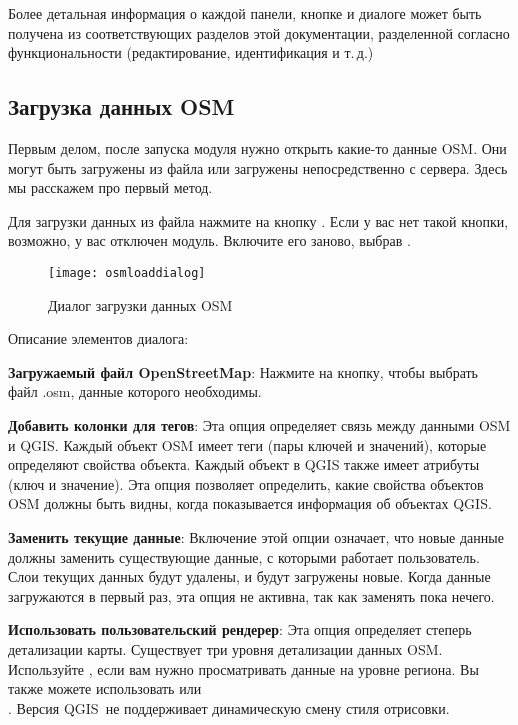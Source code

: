 Более детальная информация о каждой панели, кнопке и диалоге может быть
получена из соответствующих разделов этой документации, разделенной
согласно функциональности (редактирование, идентификация и т.\,д.)

\subsection{Загрузка данных OSM}

Первым делом, после запуска модуля нужно открыть какие-то данные OSM.
Они могут быть загружены из файла или загружены непосредственно с
сервера. Здесь мы расскажем про первый метод.

Для загрузки данных из файла нажмите на кнопку
.
 Если у вас нет такой кнопки, возможно, у вас отключен модуль.
Включите его заново, выбрав
 \arrow {} \arrow
{}.

\begin{figure}[ht]
   \centering
   \texttt{[image: osmloaddialog]}
   \caption{Диалог загрузки данных OSM \wincaption}\label{fig:osmload}
\end{figure}

Описание элементов диалога:

\begin{description}
\item \textbf{Загружаемый файл OpenStreetMap}: Нажмите на кнопку, чтобы
выбрать файл .osm, данные которого необходимы.
\item \textbf{Добавить колонки для тегов}: Эта опция определяет связь
между данными OSM и QGIS. Каждый объект OSM имеет теги (пары ключей и
значений), которые определяют свойства объекта. Каждый объект в QGIS
также имеет атрибуты (ключ и значение). Эта опция позволяет определить,
какие свойства объектов OSM должны быть видны, когда показывается
информация об объектах QGIS.
\item \textbf{Заменить текущие данные}: Включение этой опции означает,
что новые данные должны заменить существующие данные, с которыми
работает пользователь. Слои текущих данных будут удалены, и будут загружены
новые. Когда данные загружаются в первый раз, эта опция не активна, так
как заменять пока нечего.
\item \textbf{Использовать пользовательский рендерер}: Эта опция
определяет степерь детализации карты. Существует три уровня детализации
данных OSM. Используйте , если вам нужно
просматривать данные на уровне региона. Вы также можете использовать
 или \\
. Версия QGIS~\CURRENT не поддерживает
динамическую смену стиля отрисовки.
\end{description}

